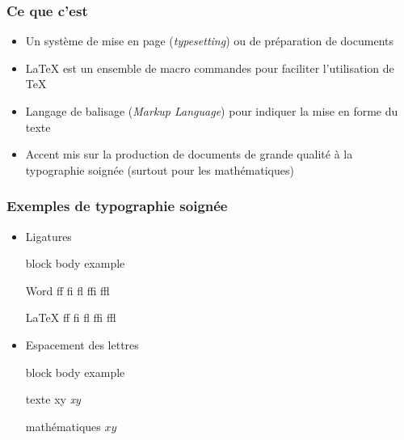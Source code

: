\documentclass[aspectratio=54,10pt,xcolor=x11names]{beamer}
\renewenvironment{quote}{%
    \begin{beamercolorbox}[wd=\linewidth,sep=6pt]{block body example}}
    {\end{beamercolorbox}}
\theoremstyle{example}
\begin{document}
\begin{frame}
  \frametitle{Ce que c'est}
  \begin{itemize}
  \item Un système de mise en page (\emph{typesetting}) ou de préparation de
    documents
  \item {\LaTeX} est un ensemble de macro commandes pour faciliter
    l'utilisation de {\TeX}
  \item Langage de balisage (\emph{Markup Language}) pour indiquer la
    mise en forme du texte
  \item Accent mis sur la production de documents de grande qualité à
    la typographie soignée (surtout pour les mathématiques)
  \end{itemize}
\end{frame}

\begin{frame}
  \frametitle{Exemples de typographie soignée}
  \begin{itemize}
  \item Ligatures
    \begin{quote}
      \begin{minipage}{0.45\linewidth}
        \vspace{-12pt}
        \begin{block}{\small Word}
          \rmfamily f\/f \quad f\/i \quad f\/l \quad f\/f\/i \quad
          f\/f\/l
        \end{block}
      \end{minipage}
      \hfill
      \begin{minipage}{0.4\linewidth}
        \vspace{-12pt}
        \begin{block}{\small \LaTeX}
          \rmfamily ff \quad fi \quad fl \quad ffi \quad ffl
        \end{block}
      \end{minipage}
    \end{quote}
  \item Espacement des lettres
    \begin{quote}
      \begin{minipage}{0.45\linewidth}
        \vspace{-12pt}
        \begin{block}{\small texte}
          \rmfamily xy \quad \emph{xy}
        \end{block}
      \end{minipage}
      \hfill
      \begin{minipage}{0.4\linewidth}
        \vspace{-12pt}
        \begin{block}{\small mathématiques}
          $xy$
        \end{block}
      \end{minipage}
    \end{quote}
  \end{itemize}
\end{frame}
\end{document}
